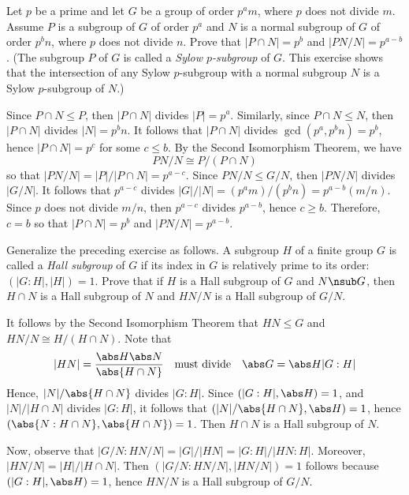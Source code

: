 \begin{specialexercise}\label{ex3.3.9}
    Let $p$ be a prime and let $G$ be a group of order $p^am$, where $p$ does not divide $m$. Assume $P$ is a subgroup of $G$ of order $p^a$ and $N$ is a normal subgroup of $G$ of order $p^b n$, where $p$ does not divide $n$. Prove that $|P \cap N| = p^b$ and $|PN/N| = p^{a - b}$. (The subgroup $P$ of $G$ is called a \emph{Sylow $p$-subgroup} of $G$. This exercise shows that the intersection of any Sylow $p$-subgroup with a normal subgroup $N$ is a Sylow $p$-subgroup of $N$.)
\end{specialexercise}

\begin{sol}
    Since $P \cap N \leq P$, then $|P \cap N|$ divides $|P| = p^a$. Similarly, since $P \cap N \leq N$, then $|P \cap N|$ divides $|N| = p^b n$. It follows that $|P \cap N|$ divides $\gcd(p^a, p^b n) = p^b$, hence $|P \cap N| = p^c$ for some $c \leq b$. By the Second Isomorphism Theorem, we have
    \[PN/N \cong P/(P \cap N)\]
    so that $|PN/N| = |P|/|P \cap N| = p^{a - c}$. Since $PN/N \leq G/N$, then $|PN/N|$ divides $|G/N|$. It follows that $p^{a - c}$ divides $|G|/|N| = (p^a m)/(p^b n) = p^{a - b}(m/n)$. Since $p$ does not divide $m/n$, then $p^{a - c}$ divides $p^{a - b}$, hence $c \geq b$. Therefore, $c = b$ so that $|P \cap N| = p^b$ and $|PN/N| = p^{a - b}$.
\end{sol}

\begin{exercise}\label{ex3.3.10}
    Generalize the preceding exercise as follows. A subgroup $H$ of a finite group $G$ is called a \emph{Hall subgroup} of $G$ if its index in $G$ is relatively prime to its order: $(|G : H|, |H|) = 1$. Prove that if $H$ is a Hall subgroup of $G$ and $N \nsub G$, then $H \cap N$ is a Hall subgroup of $N$ and $HN/N$ is a Hall subgroup of $G/N$.
\end{exercise}

\begin{sol}
    It follows by the Second Isomorphism Theorem that $HN \leq G$ and $HN/N \cong H/(H \cap N)$. Note that
    \[|HN| = \frac{\abs H \abs N}{\abs{H \cap N}} \quad \text{must divide} \quad \abs G = \abs H |G : H|\]
    Hence, $|N|/\abs{H \cap N}$ divides $|G : H|$. Since $(|G : H|, \abs H) = 1$, and $|N|/|H \cap N|$ divides $|G : H|$, it follows that $(|N|/\abs{H \cap N}, \abs H) = 1$, hence $(\abs{N : H \cap N}, \abs{H \cap N}) = 1$. Then $H \cap N$ is a Hall subgroup of $N$.

    Now, observe that $|G/N : HN/N| = |G|/|HN| = |G:H|/|HN : H|$. Moreover, $|HN/N| = |H|/|H \cap N|$. Then $(|G/N : HN/N|, |HN/N|) = 1$ follows because $(|G : H|, \abs H) = 1$, hence $HN/N$ is a Hall subgroup of $G/N$.
\end{sol}

